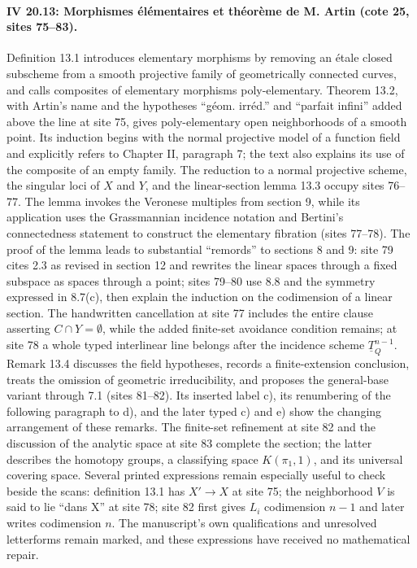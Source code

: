 \paragraph{IV 20.13: Morphismes élémentaires et théorème de M. Artin (cote 25, sites 75--83).}
Definition 13.1 introduces elementary morphisms by removing an étale closed subscheme from a smooth projective family of geometrically connected curves, and calls composites of elementary morphisms poly-elementary. Theorem 13.2, with Artin's name and the hypotheses ``géom. irréd.'' and ``parfait infini'' added above the line at site 75, gives poly-elementary open neighborhoods of a smooth point. Its induction begins with the normal projective model of a function field and explicitly refers to Chapter II, paragraph 7; the text also explains its use of the composite of an empty family. The reduction to a normal projective scheme, the singular loci of $X$ and $Y$, and the linear-section lemma 13.3 occupy sites 76--77. The lemma invokes the Veronese multiples from section 9, while its application uses the Grassmannian incidence notation and Bertini's connectedness statement to construct the elementary fibration (sites 77--78). The proof of the lemma leads to substantial ``remords'' to sections 8 and 9: site 79 cites 2.3 as revised in section 12 and rewrites the linear spaces through a fixed subspace as spaces through a point; sites 79--80 use 8.8 and the symmetry expressed in 8.7(c), then explain the induction on the codimension of a linear section. The handwritten cancellation at site 77 includes the entire clause asserting $C\cap Y=\emptyset$, while the added finite-set avoidance condition remains; at site 78 a whole typed interlinear line belongs after the incidence scheme $\underline{T}^{n-1}_Q$. Remark 13.4 discusses the field hypotheses, records a finite-extension conclusion, treats the omission of geometric irreducibility, and proposes the general-base variant through 7.1 (sites 81--82). Its inserted label c), its renumbering of the following paragraph to d), and the later typed c) and e) show the changing arrangement of these remarks. The finite-set refinement at site 82 and the discussion of the analytic space at site 83 complete the section; the latter describes the homotopy groups, a classifying space $K(\pi_1,1)$, and its universal covering space. Several printed expressions remain especially useful to check beside the scans: definition 13.1 has $X'\to X$ at site 75; the neighborhood $V$ is said to lie ``dans X'' at site 78; site 82 first gives $L_i$ codimension $n-1$ and later writes codimension $n$. The manuscript's own qualifications and unresolved letterforms remain marked, and these expressions have received no mathematical repair.
